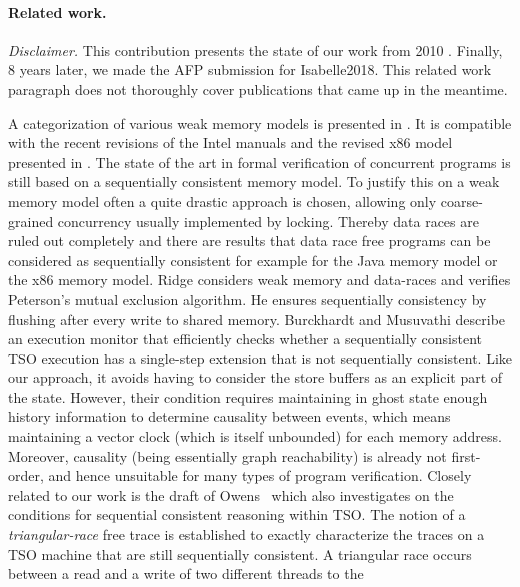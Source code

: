 \documentclass[11pt]{llncs}
\begin{document}
\paragraph{Related work.}

\emph{Disclaimer.}
This contribution presents the state of our work from 2010 \cite{Cohen:ITP2010-}.
Finally, 8 years later, we made the AFP submission for Isabelle2018. 
This related work paragraph does not thoroughly cover publications that came up in the meantime.

 
A categorization of various weak memory models is presented in
\cite{Adve:Computer-29-12-66}.  It is
compatible with the recent revisions of the Intel manuals
\cite{Intel:IIA2006-ALL} and the revised x86 model presented in
\cite{Owens:TPHOL09-?}.  The state of the art in formal verification
of concurrent programs is still based on a sequentially consistent
memory model.  To justify this on a weak memory model often a quite
drastic approach is chosen, allowing only coarse-grained concurrency
usually implemented by locking. Thereby data races are ruled out
completely and there are results that data race free programs can be
considered as sequentially consistent for example for the Java memory
model \cite{DBLP:conf/ecoop/SevcikA08,DBLP:conf/tphol/AspinallS07} or
the x86 memory model\cite{Owens:TPHOL09-?}.  Ridge
\cite{conf/tphol/Ridge07} considers weak memory and data-races and
verifies Peterson's mutual exclusion algorithm. He ensures
sequentially consistency by flushing after every write to shared
memory.
%
Burckhardt and Musuvathi\cite{Sober} describe an execution monitor that 
efficiently checks whether a sequentially consistent TSO execution has a single-step
extension that is not sequentially consistent. Like our approach, it
avoids having to consider the store buffers as an explicit part of the
state. However, their condition requires maintaining in ghost state
enough history information to determine causality between events,
which means maintaining a vector clock (which is itself unbounded) for
each memory address. Moreover, causality (being essentially graph
reachability) is already not first-order, and hence unsuitable for
many types of program verification. 
%
Closely related to our work is the draft of Owens~\cite{Owens-draft} which also
investigates on the conditions for sequential consistent reasoning within TSO.
The notion of a \emph{triangular-race} free trace is established to exactly
characterize the traces on a TSO machine that are still sequentially consistent.
A triangular race occurs between a read and a write of two different threads to the
\end{document}
